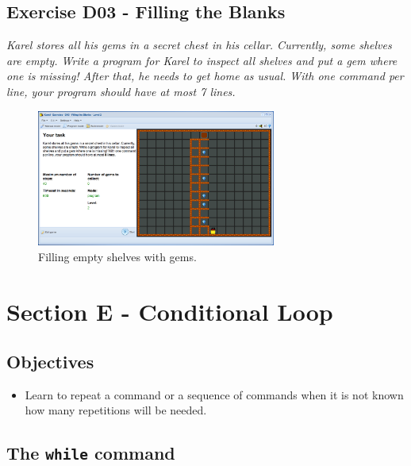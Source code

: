 \documentclass[article,A4,12pt]{llncs}
\begin{document}
{{{{\newpage




\subsection{Exercise D03 - Filling the Blanks}

{\em Karel stores all his gems in a secret chest in his cellar. 
Currently, some shelves are empty. Write a program for Karel to 
inspect all shelves and put a gem where one is missing! After that, he needs to get 
home as usual. With one 
command per line, your program should have at most 7 lines.}

\begin{figure}[!ht]
\begin{center}
\includegraphics[width=0.7\textwidth]{img/d03.png}
\end{center}
\vspace{-4mm}
\caption{Filling empty shelves with gems.}
\label{fig:d03}
\vspace{-4mm}
\end{figure}
\noindent



\section{Section E - Conditional Loop}

\subsection{Objectives} 
 
\begin{itemize}
\item Learn to repeat a command or a sequence of commands when it is not known 
      how many repetitions will be needed.
\end{itemize}

\subsection{The {\tt while} command}

}}}}
\end{document}
